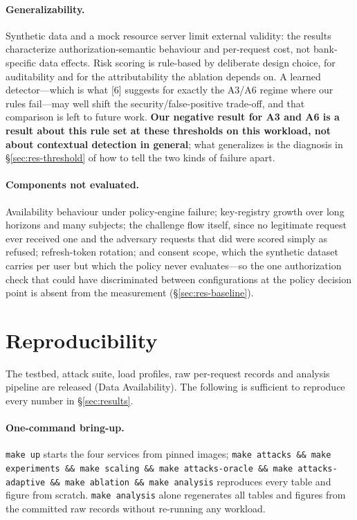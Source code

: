 \paragraph{Generalizability.} Synthetic data and a mock resource server limit external validity: the results characterize authorization-semantic behaviour and per-request cost, not bank-specific data effects. Risk scoring is rule-based by deliberate design choice, for auditability and for the attributability the ablation depends on. A learned detector---which is what [6] suggests for exactly the A3/A6 regime where our rules fail---may well shift the security/false-positive trade-off, and that comparison is left to future work. \textbf{Our negative result for A3 and A6 is a result about this rule set at these thresholds on this workload, not about contextual detection in general}; what generalizes is the diagnosis in \S\ref{sec:res-threshold} of how to tell the two kinds of failure apart.

\paragraph{Components not evaluated.} Availability behaviour under policy-engine failure; key-registry growth over long horizons and many subjects; the challenge flow itself, since no legitimate request ever received one and the adversary requests that did were scored simply as refused; refresh-token rotation; and consent scope, which the synthetic dataset carries per user but which the policy never evaluates---so the one authorization check that could have discriminated between configurations at the policy decision point is absent from the measurement (\S\ref{sec:res-baseline}).

\section{Reproducibility}
\label{sec:reproducibility}

The testbed, attack suite, load profiles, raw per-request records and analysis pipeline are released (Data Availability). The following is sufficient to reproduce every number in \S\ref{sec:results}.

\paragraph{One-command bring-up.} \texttt{make up} starts the four services from pinned images; \texttt{make attacks \&\& make experiments \&\& make scaling \&\& make attacks-oracle \&\& make attacks-adaptive \&\& make ablation \&\& make analysis} reproduces every table and figure from scratch. \texttt{make analysis} alone regenerates all tables and figures from the committed raw records without re-running any workload.

